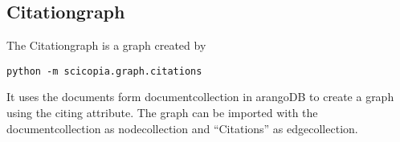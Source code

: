 \subsection{Citationgraph}
The Citationgraph is a graph created by 
\begin{verbatim}
python -m scicopia.graph.citations
\end{verbatim}
It uses the documents form documentcollection in arangoDB to create a graph using the citing 
attribute. The graph can be imported with the documentcollection as nodecollection and ``Citations'' as edgecollection.
